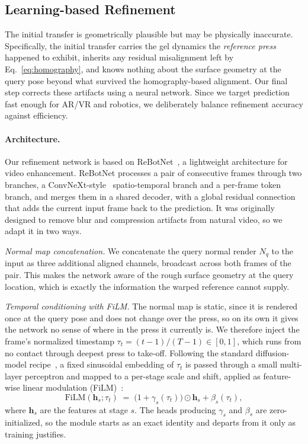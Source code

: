 \subsection{Learning-based Refinement}
\label{sec:refine}

The initial transfer is geometrically plausible but may be physically inaccurate.
Specifically, the initial transfer carries the gel dynamics the \emph{reference press} happened to exhibit,
inherits any residual misalignment left by Eq.~\ref{eq:homography}, and 
knows nothing about the surface geometry at the query pose beyond what survived the homography-based alignment.
Our final step corrects these artifacts using a neural network. Since we target
prediction fast enough for AR/VR and robotics, we deliberately balance refinement accuracy against
efficiency.

\paragraph{Architecture.}
Our refinement network is based on ReBotNet~\cite{rebotnet}, a lightweight architecture for video
enhancement. ReBotNet processes a pair of consecutive frames through two branches, a
ConvNeXt-style~\cite{convnext} spatio-temporal branch and a per-frame token branch, and merges them in a shared
decoder, with a global residual connection that adds the current input frame back to the
prediction. It was originally designed to remove blur and compression artifacts from natural
video, so we adapt it in two ways.

\emph{Normal map concatenation.} We concatenate the query normal render $N_q$ to the input as
three additional aligned channels, broadcast across both frames of the pair. This makes the
network aware of the rough surface geometry at the query location, which is exactly the
information the warped reference cannot supply.

\emph{Temporal conditioning with FiLM.} The normal map is static, since it is rendered once at the
query pose and does not change over the press, so on its own it gives the network no sense of
where in the press it currently is. We therefore inject the frame's normalized timestamp
$\tau_t = (t-1)/(T-1) \in [0,1]$, which runs from no contact through deepest press to take-off.
Following the standard diffusion-model recipe~\cite{ldm}, a fixed sinusoidal embedding of $\tau_t$
is passed through a small multi-layer perceptron and mapped to a per-stage scale and shift, applied
as feature-wise linear modulation (FiLM)~\cite{film}:
\begin{equation}
  \mathrm{FiLM}(\mathbf{h}_s; \tau_t) \;=\;
  \bigl(1 + \gamma_s(\tau_t)\bigr) \odot \mathbf{h}_s + \beta_s(\tau_t),
\end{equation}
where $\mathbf{h}_s$ are the features at stage $s$. The heads producing $\gamma_s$ and $\beta_s$
are zero-initialized, so the module starts as an exact identity and departs from it only as
training justifies.

